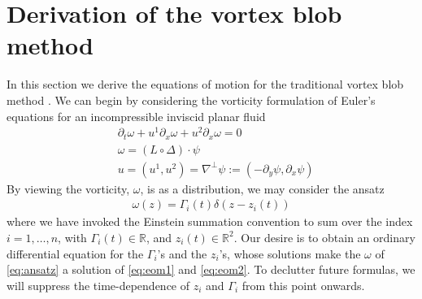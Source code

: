 \documentclass[12pt]{amsart}
\begin{document}
\section{Derivation of the vortex blob method}
\label{sec:vortex_blob}
In this section we derive the equations of motion for the traditional
vortex blob method .
We can begin by considering the vorticity formulation of Euler's equations for an incompressible inviscid planar fluid
\begin{align}
  &\partial_t \omega + u^1 \partial_x \omega + u^2 \partial_x \omega = 0 \label{eq:eom1} \\
  &\omega = (L \circ \Delta) \cdot \psi \label{eq:eom2} \\
  &u = (u^1,u^2) = \nabla^\perp \psi :=  (- \partial_y \psi, \partial_x \psi)
  \label{eq:u}
\end{align}
By viewing the vorticity, $\omega$, is as a distribution,
we may consider the ansatz
\begin{align}
  \omega(z) = \Gamma_i(t) \delta(z-z_i(t))
  \label{eq:ansatz}
\end{align} 
where we have invoked the Einstein summation convention to sum over 
the index $i=1,\dots,n$,
with $\Gamma_i(t) \in \mathbb{R}$,
and $z_i(t) \in \mathbb{R}^2$.
Our desire is to obtain an ordinary differential equation for the $\Gamma_i$'s and the $z_i$'s,
whose solutions make the $\omega$ of \eqref{eq:ansatz} a solution of \eqref{eq:eom1} and \eqref{eq:eom2}.
To declutter future formulas,
we will suppress the time-dependence of $z_i$ and $\Gamma_i$
from this point onwards.
\end{document}

